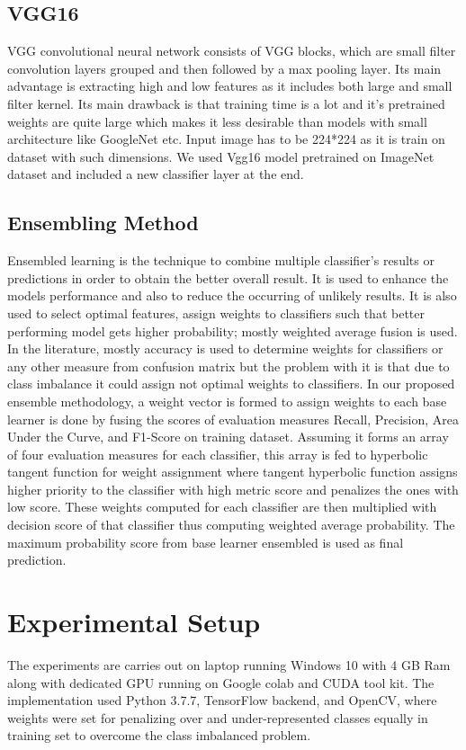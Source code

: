 \documentclass{ieeeaccess}
\begin{document}
\subsection{VGG16}
VGG convolutional neural network consists of VGG blocks, which are small filter convolution layers grouped and then followed by a max pooling layer. Its main advantage is extracting high and low features as it includes both large and small filter kernel. Its main drawback is that training time is a lot and it’s pretrained weights are quite large which makes it less desirable than models with small architecture like GoogleNet etc. Input image has to be 224*224 as it is train on dataset with such dimensions. We used Vgg16 model pretrained on ImageNet dataset and included a new classifier layer at the end.
\subsection{Ensembling Method}
Ensembled learning is the technique to combine multiple classifier’s results or predictions in order to obtain the better overall result. It is used to enhance the models performance and also to reduce the occurring of unlikely results. It is also used to select optimal features, assign weights to classifiers such that better performing model gets higher probability; mostly weighted average fusion is used. In the literature, mostly accuracy is used to determine weights for classifiers or any other measure from confusion matrix but the problem with it is that due to class imbalance it could assign not optimal weights to classifiers. 
In our proposed ensemble methodology, a weight vector is formed to assign weights to each base learner is done by fusing the scores of evaluation measures Recall, Precision, Area Under the Curve, and F1-Score on training dataset. Assuming it forms an array of four evaluation measures for each classifier, this array is fed to hyperbolic tangent function for weight assignment where tangent hyperbolic function assigns higher priority to the classifier with high metric score and penalizes the ones with low score. These weights computed for each classifier are then multiplied with decision score of that classifier thus computing weighted average probability. The maximum probability score from base learner ensembled is used as final prediction. 

\section{Experimental Setup}
The experiments are carries out on laptop running Windows 10 with 4 GB Ram along with dedicated GPU running on Google colab and CUDA tool kit. The implementation used Python 3.7.7, TensorFlow backend, and OpenCV, where weights were set for penalizing over and under-represented classes equally in training set to overcome the class imbalanced problem.
\end{document}
